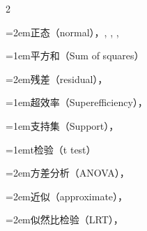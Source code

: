 \begin{multicols}{2}
\par\noindent\hangindent=2em\hspace*{1em}\label{idx:1011}正态（normal），\hyperref[ex:6.2.4]{\pageref*{ex:6.2.4}}, \hyperref[ex:6.2.7]{\pageref*{ex:6.2.7}}, \hyperref[ex:6.2.9]{\pageref*{ex:6.2.9}}, \hyperref[ex:6.2.12]{\pageref*{ex:6.2.12}}\par
\par\addvspace{2pt}
\par\noindent\hangindent=1em\hspace*{0em}\label{idx:1012}平方和（Sum of squares）\par
\par\noindent\hangindent=2em\hspace*{1em}\label{idx:1013}残差（residual），\hyperref[idxocc:1013:469]{\pageref*{idxocc:1013:469}}\par
\par\addvspace{2pt}
\par\noindent\hangindent=1em\hspace*{0em}\label{idx:1014}超效率（Superefficiency），\hyperref[sec:10.6.1]{\pageref*{sec:10.6.1}}\par
\par\addvspace{2pt}
\par\noindent\hangindent=1em\hspace*{0em}\label{idx:1015}支持集（Support），\hyperref[idxocc:1015:71]{\pageref*{idxocc:1015:71}}\par
\par\addvspace{2pt}
\par\noindent\hangindent=1em\hspace*{0em}\label{idx:1016}t检验（t test）\par
\par\noindent\hangindent=2em\hspace*{1em}\label{idx:1017}方差分析（ANOVA），\hyperref[eq:11.2.7]{\pageref*{eq:11.2.7}}\par
\par\noindent\hangindent=2em\hspace*{1em}\label{idx:1018}近似（approximate），\hyperref[exercise:8.42]{\pageref*{exercise:8.42}}\par
\par\noindent\hangindent=2em\hspace*{1em}\label{idx:1019}似然比检验（LRT），\hyperref[ex:8.2.6]{\pageref*{ex:8.2.6}}\par

\end{multicols}
